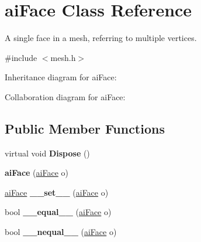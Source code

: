 \hypertarget{structai_face}{\section{ai\+Face Class Reference}
\label{structai_face}
}


A single face in a mesh, referring to multiple vertices.  




{\ttfamily \#include $<$mesh.\+h$>$}



Inheritance diagram for ai\+Face\+:


Collaboration diagram for ai\+Face\+:
\subsection*{Public Member Functions}
\begin{DoxyCompactItemize}
\item 
\hypertarget{structai_face_abc924f9e2d678da3e81682108b2982a7}{virtual void {\bfseries Dispose} ()}\label{structai_face_abc924f9e2d678da3e81682108b2982a7}

\item 
\hypertarget{structai_face_a3ab0a0dcc0036362c353d8714e23f620}{{\bfseries ai\+Face} (\hyperlink{structai_face}{ai\+Face} o)}\label{structai_face_a3ab0a0dcc0036362c353d8714e23f620}

\item 
\hypertarget{structai_face_aa6f419499920facd09f46b927d27f320}{\hyperlink{structai_face}{ai\+Face} {\bfseries \+\_\+\+\_\+set\+\_\+\+\_\+} (\hyperlink{structai_face}{ai\+Face} o)}\label{structai_face_aa6f419499920facd09f46b927d27f320}

\item 
\hypertarget{structai_face_a440e26f1269745031d907ddb1228543e}{bool {\bfseries \+\_\+\+\_\+equal\+\_\+\+\_\+} (\hyperlink{structai_face}{ai\+Face} o)}\label{structai_face_a440e26f1269745031d907ddb1228543e}

\item 
\hypertarget{structai_face_a5b0fe29de42979b476c6446097af1d28}{bool {\bfseries \+\_\+\+\_\+nequal\+\_\+\+\_\+} (\hyperlink{structai_face}{ai\+Face} o)}\label{structai_face_a5b0fe29de42979b476c6446097af1d28}

\end{DoxyCompactItemize}
